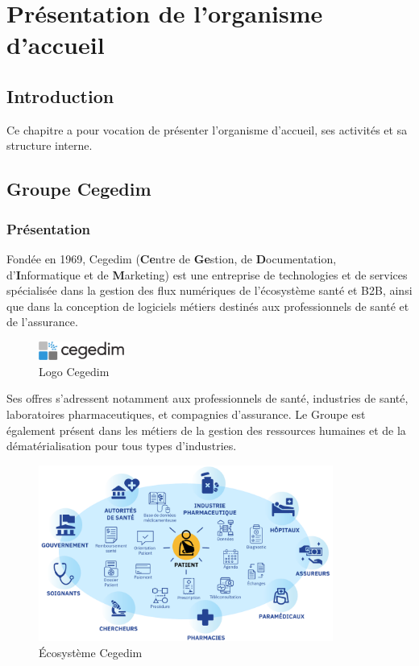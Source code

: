 \section{Présentation de l'organisme d'accueil}
\label{sec:presentation}
\subsection*{Introduction}
Ce chapitre a pour vocation de présenter l'organisme d'accueil, ses activités et sa structure interne.
\subsection{Groupe Cegedim}
\subsubsection{Présentation}
Fondée en 1969, Cegedim (\textbf{Ce}ntre de \textbf{Ge}stion, de \textbf{D}ocumentation, d’\textbf{I}nformatique et de \textbf{M}arketing) est une entreprise de technologies et de services spécialisée dans la gestion des flux numériques de l’écosystème santé et B2B, ainsi que dans la conception de logiciels métiers destinés aux professionnels de santé et de l’assurance.\\

\begin{figure}[H]
    \centering
    \includegraphics[width=0.25\textwidth]{images/sec1/cegedim-logo.pdf}
    \caption{Logo Cegedim}
\end{figure}

Ses offres s’adressent notamment aux professionnels de santé, industries de santé, laboratoires pharmaceutiques, et compagnies d’assurance. Le Groupe est également présent dans les métiers de la gestion des ressources humaines et de la dématérialisation pour tous types d’industries.
\begin{figure}[H]
    \centering
    \includegraphics[width=0.86\textwidth]{images/sec1/cegedim-ecosystem.pdf}
    \caption{Écosystème Cegedim}
\end{figure}
